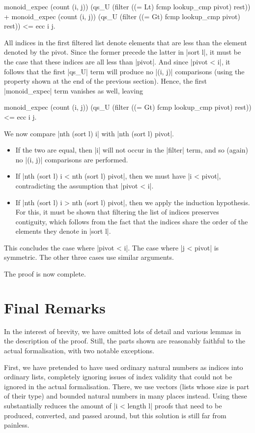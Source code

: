 \documentclass[runningheads]{llncs}
\begin{document}
\begin{code}
monoid_expec (count (i, j)) (qs_U (filter ((= Lt) fcmp lookup_cmp pivot) rest)) +
monoid_expec (count (i, j)) (qs_U (filter ((= Gt) fcmp lookup_cmp pivot) rest))
  <= ecc i j.
\end{code}
All indices in the first filtered list denote elements that are less than the element denoted by the pivot. Since the former precede the latter in |sort l|, it must be the case that these indices are all less than |pivot|. And since |pivot < i|, it follows that the first |qs_U| term will produce no |(i, j)| comparisons (using the property 
shown at the end of the previous section). Hence, the first |monoid_expec| term vanishes as well, leaving
\begin{code}
monoid_expec (count (i, j))
  (qs_U (filter ((= Gt) fcmp lookup_cmp pivot) rest)) <= ecc i j.
\end{code}
We now compare |nth (sort l) i| with |nth (sort l) pivot|.
\begin{itemize}
\item If the two are equal, then |i| will not occur in the |filter| term, and so (again) no |(i, j)| comparisons are performed.
\item If |nth (sort l) i < nth (sort l) pivot|, then we must have |i < pivot|, contradicting the assumption that |pivot < i|.
\item If |nth (sort l) i > nth (sort l) pivot|, then we apply the induction hypothesis. For this, it must be shown that filtering the list of indices preserves contiguity, which follows from the fact that the indices share the order of the elements they denote in |sort l|.
\end{itemize}
This concludes the case where |pivot < i|. The case where |j < pivot| is symmetric. The other three cases use similar arguments.

The proof is now complete.

\section{Final Remarks}
\label{conclusion}

In the interest of brevity, we have omitted lots of detail and various lemmas in the description of the proof. Still, the parts shown are reasonably faithful to the actual formalisation, with two notable exceptions.

First, we have pretended to have used ordinary natural numbers as indices into ordinary lists, completely ignoring issues of index validity that could not be ignored in the actual formalisation. There, we use vectors (lists whose size is part of their type) and bounded natural numbers in many places instead. Using these substantially reduces the amount of |i < length l| proofs that need to be produced, converted, and passed around, but this solution is still far from painless.
\end{document}
